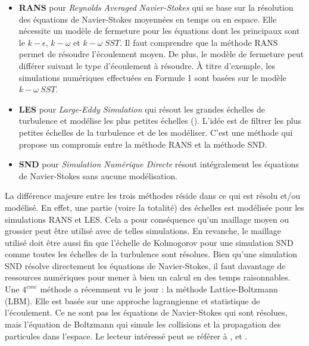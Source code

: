 \begin{itemize}

	\item \textbf{RANS} pour \textit{Reynolds Averaged Navier-Stokes} qui se base sur la résolution des équations de Navier-Stokes moyennées en temps ou en espace. Elle nécessite un modèle de fermeture pour les équations dont les principaux sont le $k-\epsilon$, $k-\omega$ et $k-\omega~SST$. Il faut comprendre que la méthode RANS permet de résoudre l'écoulement moyen. De plus, le modèle de fermeture peut différer suivant le type d'écoulement à résoudre. À titre d'exemple, les simulations numériques effectuées en Formule 1 sont basées sur le modèle $k-\omega~SST$.

	\item \textbf{LES} pour \textit{Large-Eddy Simulation} qui résout les grandes échelles de turbulence et modélise les plus petites échelles (\cite{Sagaut2005}). L'idée est de filtrer les plus petites échelles de la turbulence et de les modéliser. C'est une méthode qui propose un compromis entre la méthode RANS et la méthode SND. 

	\item \textbf{SND} pour \textit{Simulation Numérique Directe} résout intégralement les équations de Navier-Stokes sans aucune modélisation.
\end{itemize}

La différence majeure entre les trois méthodes réside dans ce qui est résolu et/ou modélisé. En effet, une partie (voire la totalité) des échelles est modélisée pour les simulations RANS et LES. Cela a pour conséquence qu'un maillage moyen ou grossier peut être utilisé avec de telles simulations. En revanche, le maillage utilisé doit être aussi fin que l'échelle de Kolmogorov pour une simulation SND comme toutes les échelles de la turbulence sont résolues. Bien qu'une simulation SND résolve directement les équations de Navier-Stokes, il faut davantage de ressources numériques pour mener à bien un calcul en des temps raisonnables. Une $4^{\grave{e}me}$ méthode a récemment vu le jour : la méthode Lattice-Boltzmann (LBM). Elle est basée sur une approche lagrangienne et statistique de l'écoulement. Ce ne sont pas les équations de Navier-Stokes qui sont résolues, mais l'équation de Boltzmann qui simule les collisions et la propagation des particules dans l'espace. Le lecteur intéressé peut se référer à \cite{chen1998}, \cite{mohamad2011} et \cite{Teschner_Lecture}.\\

